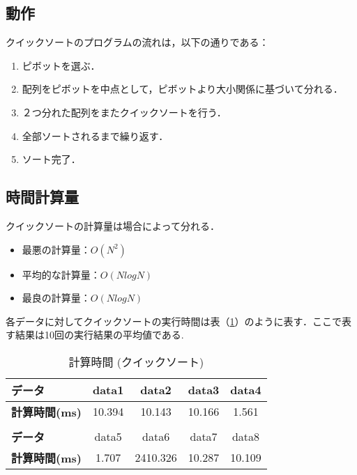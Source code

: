 \documentclass[a4j, titlepage]{jarticle}
\begin{document}
        \subsection{動作}
            クイックソートのプログラムの流れは，以下の通りである：
            \begin{screen}
                \begin{enumerate}
                    \item ピボットを選ぶ．
                    \item 配列をピボットを中点として，ピボットより大小関係に基づいて分れる．
                    \item ２つ分れた配列をまたクイックソートを行う．
                    \item 全部ソートされるまで繰り返す．
                    \item ソート完了．
                \end{enumerate}
            \end{screen}
        
        \subsection{時間計算量}
            クイックソートの計算量は場合によって分れる．
            \begin{itemize}
                \item 最悪の計算量：$O(N^2)$
                \item 平均的な計算量：$O(NlogN)$
                \item 最良の計算量：$O(NlogN)$
            \end{itemize}

            各データに対してクイックソートの実行時間は表（\ref{tab:quick}）のように表す．ここで表す結果は10回の実行結果の平均値である.

            \begin{table}[tbh]
                \caption{計算時間 (クイックソート)}
                \label{tab:quick}
                \begin{center}
                    \begin{tabular}{lcccc}
                        \hline
                        \textbf{データ} & data1 & data2 &data3 &data4 \\ \hline
                        \textbf{計算時間(ms)} & 10.394 & 10.143 & 10.166 & 1.561 \\ \hline
                        \\ \hline
                        \textbf{データ} & data5 &data6 &data7 &data8\\ \hline
                        \textbf{計算時間(ms)} & 1.707 & 2410.326 & 10.287 & 10.109 \\ \hline
                    \end{tabular}
                \end{center}
            \end{table}
\end{document}

